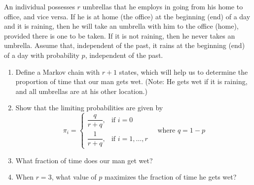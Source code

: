 \setcounter{exercise}{45}

\begin{exercise}%
\label{ex:markov-chains-46}
An individual possesses $r$ umbrellas that he employs in going from his home to office, and vice versa. If he is at home (the office) at the beginning (end) of a day and it is raining, then he will take an umbrella with him to the office (home), provided there is one to be taken. If it is not raining, then he never takes an umbrella. Assume that, independent of the past, it rains at the beginning (end) of a day with probability $p$, independent of the past.
\begin{enumerate}
\item[(a)] Define a Markov chain with $r + 1$ states, which will help us to determine the proportion of time that our man gets wet. (Note: He gets wet if it is raining, and all umbrellas are at his other location.)
\item[(b)] Show that the limiting probabilities are given by
\[
\pi_i = \begin{cases}
\dfrac{q}{r + q}, & \text{if } i = 0 \\
\dfrac{1}{r + q}, & \text{if } i = 1, \dots, r
\end{cases} \quad \text{where } q = 1 - p
\]
\item[(c)] What fraction of time does our man get wet?
\item[(d)] When $r = 3$, what value of $p$ maximizes the fraction of time he gets wet?
\end{enumerate}
\end{exercise}
